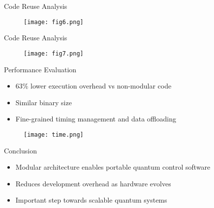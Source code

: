 \documentclass[18 pt]{beamer}
\begin{document}
  \begin{frame}{Code Reuse Analysis}
    \begin{figure}
      \texttt{[image: fig6.png]}
    \end{figure}
  \end{frame}
  \begin{frame}{Code Reuse Analysis}
    \begin{figure}
      \texttt{[image: fig7.png]}
    \end{figure}
  \end{frame}
\begin{frame}{Performance Evaluation}
\begin{itemize}
\item 63\% lower execution overhead vs non-modular code
\item Similar binary size
\item Fine-grained timing management and data offloading
\end{itemize}
\end{frame}
\begin{frame}
  \begin{figure}
    \texttt{[image: time.png]}
  \end{figure}
\end{frame}

\begin{frame}{Conclusion}
\begin{itemize}
\item Modular architecture enables portable quantum control software
\item Reduces development overhead as hardware evolves
\item Important step towards scalable quantum systems
\end{itemize}

\end{frame}
\end{document}
